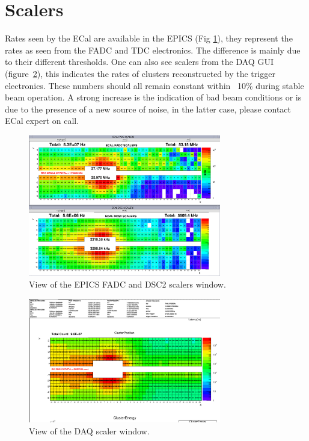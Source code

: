 \documentclass[12pt]{article}
\begin{document}
      \section{Scalers}

         Rates seen by the ECal are available in the EPICS (Fig \ref{Scalers}), they represent the rates as seen from the FADC and TDC electronics. The difference is mainly due to their different thresholds. One can also see scalers from the DAQ GUI (figure~\ref{DAQscalers}), this indicates the rates of clusters reconstructed by the trigger electronics. These numbers should all remain constant within ~10\% during stable beam operation. A strong increase is the indication of bad beam conditions or is due to the presence of a new source of noise, in the latter case, please contact ECal expert on call.

\begin{figure}[hbp]
\center
\includegraphics[width=0.75\textwidth]{pics/ECAL_FADC_SCALER_2014_12_20.png}
\caption{\small \label{Scalers} View of the EPICS FADC and DSC2 scalers window.}
\end{figure}

\begin{figure}[hbp]
\center
\includegraphics[width=0.75\textwidth]{pics/ecal-cluster-12-20-14.png}
\caption{\small \label{DAQscalers} View of the DAQ scaler window.}
\end{figure}
\end{document}
